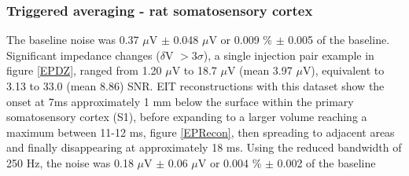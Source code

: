 \subsubsection{Triggered averaging - rat somatosensory cortex}

The baseline noise was 0.37 $\mu$V $\pm$ 0.048 $\mu$V or 0.009 \% $\pm$ 0.005 of the baseline. Significant impedance changes ($\delta$V $> 3\sigma$), a single injection pair example in figure \ref{EPDZ}, ranged from 1.20 $\mu$V to 18.7 $\mu$V (mean 3.97 $\mu$V), equivalent to 3.13 to 33.0 (mean 8.86) SNR. EIT reconstructions with this dataset show the onset at 7ms approximately 1 mm below the surface within the primary somatosensory cortex (S1), before expanding to a larger volume reaching a maximum between 11-12 ms, figure \ref{EPRecon}, then spreading to adjacent areas and finally disappearing at approximately 18 ms. Using the reduced bandwidth of 250 Hz, the noise was 0.18 $\mu$V $\pm$ 0.06 $\mu$V or 0.004 \% $\pm$ 0.002 of the baseline

